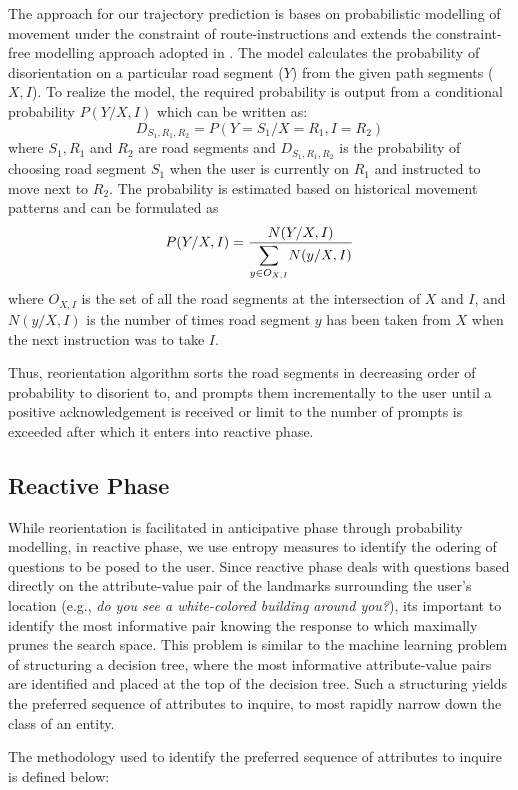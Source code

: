 \documentclass{iitkthesis}
\begin{document}
The approach for our trajectory prediction is bases on probabilistic 
modelling of movement under the constraint of route-instructions and 
extends the constraint-free modelling approach adopted in \cite{liu}. The 
model calculates the probability of disorientation on a particular road segment 
($Y$) from the given path segments ($X,I$). To realize the model, the 
required probability is output from a conditional probability $P(Y/X,I)$ 
which can be written as:
%
$$D_{S_1,R_1,R_2} = P(Y=S_1/X=R_1,I=R_2)$$
%
where $S_1,R_1$ and $R_2$ are road segments and $D_{S_1,R_1,R_2}$ is the 
probability of choosing road segment $S_1$ when the user is currently 
on $R_1$ and instructed to move next to $R_2$. The probability is 
estimated based on historical movement patterns and can be formulated as
%
\[ \displaystyle P(Y/X,I) = \frac{N(Y/X,I)}{ \mathlarger{\sum}\limits_{y \in O_{X,I}} N(y/X,I)} \] 
%
where $O_{X,I}$ is the set of all the road segments at the intersection 
of $X$ and $I$, and $N(y/X,I)$ is the number of times road segment $y$ 
has been taken from $X$ when the next instruction was to take $I$. 

Thus, reorientation algorithm sorts the road segments in decreasing order 
of probability to disorient to, and prompts them incrementally to the 
user until a positive acknowledgement is received or limit to the number 
of prompts is exceeded after which it enters into reactive phase.

\subsection{Reactive Phase}
While reorientation is facilitated in anticipative phase through probability modelling, in reactive phase, we use entropy measures to identify the odering of questions to be posed to the user. Since reactive phase deals with questions based directly on the attribute-value pair of the landmarks surrounding the user's location (e.g., \textit{do you see a white-colored building around you?}), its important to identify the most informative pair knowing the response to which maximally prunes the search space. This problem is similar to the machine learning problem of structuring a decision tree, where the most informative attribute-value pairs are identified and placed at the top of the decision tree. Such a structuring yields the preferred sequence of attributes to inquire, to most rapidly narrow down the class of an entity. 

The methodology used to identify the preferred sequence of attributes to inquire is defined below:
\end{document}
